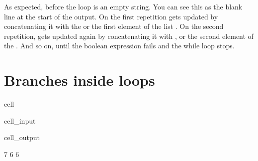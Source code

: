 \documentclass[letterpaper,10pt,english]{jupyterBook}
\begin{document}
\sphinxAtStartPar
As expected, before the loop  is an empty string. You can see this as the blank line at the start of the output. On the first repetition  gets updated by concatenating it with the  or the first element of the list . On the second repetition,  gets updated again by concatenating it with , or the second element of the . And so on, until the boolean expression  fails and the while loop stops.


\section{Branches inside loops}
\label{\detokenize{loops:branches-inside-loops}}
\begin{sphinxuseclass}{cell}\begin{sphinxVerbatimInput}

\begin{sphinxuseclass}{cell_input}
\begin{sphinxVerbatim}[commandchars=\\\{\}]
  \PYG{p}{[}\PYG{p}{]}

  
   
     \PYG{p}{[}\PYG{p}{]}  
        \PYG{p}{[}\PYG{p}{]}
        
\end{sphinxVerbatim}

\end{sphinxuseclass}\end{sphinxVerbatimInput}
\begin{sphinxVerbatimOutput}

\begin{sphinxuseclass}{cell_output}
\begin{sphinxVerbatim}[commandchars=\\\{\}]
7
6
6
\end{sphinxVerbatim}

\end{sphinxuseclass}\end{sphinxVerbatimOutput}

\end{sphinxuseclass}
\end{document}
